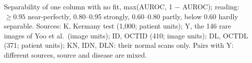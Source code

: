 Separability of one column with no fit, max(AUROC, 1 $-$ AUROC); reading: $\geq 0.95$ near-perfectly, 0.80--0.95 strongly, 0.60--0.80 partly, below 0.60 hardly separable. Sources: K, Kermany test (1,000; patient units); Y, the 146 rare images of Yoo et al.\ (image units); ID, OCTID (410; image units); DL, OCTDL (371; patient units); KN, IDN, DLN: their normal scans only. Pairs with Y: different sources, source and disease are mixed.

